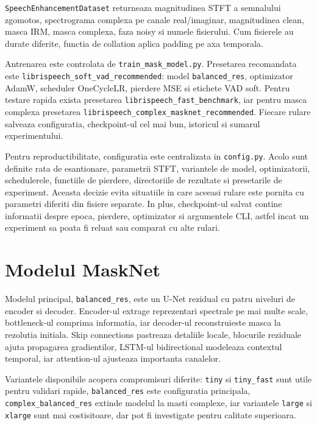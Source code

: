 \documentclass[12pt,a4paper]{report}
\begin{document}
\texttt{SpeechEnhancementDataset} returneaza magnitudinea STFT a semnalului
zgomotos, spectrograma complexa pe canale real/imaginar, magnitudinea clean,
masca IRM, masca complexa, faza noisy si numele fisierului. Cum fisierele au
durate diferite, functia de collation aplica padding pe axa temporala.

Antrenarea este controlata de \texttt{train\_mask\_model.py}. Presetarea
recomandata este \texttt{librispeech\_soft\_vad\_recommended}: model
\texttt{balanced\_res}, optimizator AdamW, scheduler OneCycleLR, pierdere MSE
si etichete VAD soft. Pentru testare rapida exista presetarea
\texttt{librispeech\_fast\_benchmark}, iar pentru masca complexa presetarea
\texttt{librispeech\_complex\_masknet\_recommended}. Fiecare rulare salveaza
configuratia, checkpoint-ul cel mai bun, istoricul si sumarul experimentului.

Pentru reproductibilitate, configuratia este centralizata in \texttt{config.py}.
Acolo sunt definite rata de esantionare, parametrii STFT, variantele de model,
optimizatorii, schedulerele, functiile de pierdere, directoriile de rezultate si
presetarile de experiment. Aceasta decizie evita situatiile in care aceeasi
rulare este pornita cu parametri diferiti din fisiere separate. In plus,
checkpoint-ul salvat contine informatii despre epoca, pierdere, optimizator si
argumentele CLI, astfel incat un experiment sa poata fi reluat sau comparat cu
alte rulari.

\section{Modelul MaskNet}

Modelul principal, \texttt{balanced\_res}, este un U-Net rezidual cu patru
niveluri de encoder si decoder. Encoder-ul extrage reprezentari spectrale pe
mai multe scale, bottleneck-ul comprima informatia, iar decoder-ul reconstruieste
masca la rezolutia initiala. Skip connections pastreaza detaliile locale,
blocurile reziduale ajuta propagarea gradientilor, LSTM-ul bidirectional
modeleaza contextul temporal, iar attention-ul ajusteaza importanta canalelor.

Variantele disponibile acopera compromisuri diferite: \texttt{tiny} si
\texttt{tiny\_fast} sunt utile pentru validari rapide, \texttt{balanced\_res}
este configuratia principala, \texttt{complex\_balanced\_res} extinde modelul
la masti complexe, iar variantele \texttt{large} si \texttt{xlarge} sunt mai
costisitoare, dar pot fi investigate pentru calitate superioara.
\end{document}
